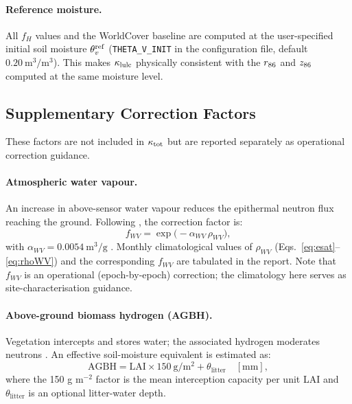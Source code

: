 \paragraph{Reference moisture.}
All $f_H$ values and the WorldCover baseline are computed at the
user-specified initial soil moisture $\theta_v^\mathrm{ref}$
(\texttt{THETA\_V\_INIT} in the configuration file, default
$\SI{0.20}{\cubic\metre\per\cubic\metre}$).
This makes $\kappa_\mathrm{lulc}$ physically consistent with the $r_{86}$ and
$z_{86}$ computed at the same moisture level.

\subsection{Supplementary Correction Factors}
\label{sec:methods:suppl}

These factors are not included in $\kappa_\mathrm{tot}$ but are reported separately
as operational correction guidance.

\paragraph{Atmospheric water vapour.}
\label{sec:methods:wv}
An increase in above-sensor water vapour reduces the epithermal
neutron flux reaching the ground.
Following \citet{rosolem2013}, the correction factor is:
\begin{equation}
  f_{WV} = \exp\!\bigl(-\alpha_{WV}\,\rho_{WV}\bigr),
  \label{eq:fWV}
\end{equation}
with $\alpha_{WV} = \SI{0.0054}{\metre\cubed\per\gram}$
\citep{zreda2012}.
Monthly climatological values of $\rho_{WV}$
(Eqs.~\eqref{eq:esat}–\eqref{eq:rhoWV}) and the corresponding
$f_{WV}$ are tabulated in the report.
Note that $f_{WV}$ is an operational (epoch-by-epoch) correction;
the climatology here serves as site-characterisation guidance.

\paragraph{Above-ground biomass hydrogen (AGBH).}
\label{sec:methods:agbh}
Vegetation intercepts and stores water; the associated hydrogen
moderates neutrons \citep{baatz2015, schron2017}.
An effective soil-moisture equivalent is estimated as:
\begin{equation}
  \mathrm{AGBH} = \mathrm{LAI} \times \SI{150}{\gram\per\metre\squared}
                  + \theta_\mathrm{litter}
  \quad[\si{\milli\metre}],
  \label{eq:agbh}
\end{equation}
where the 150 g m$^{-2}$ factor is the mean interception capacity
per unit LAI \citep{schron2017} and $\theta_\mathrm{litter}$ is an
optional litter-water depth.

